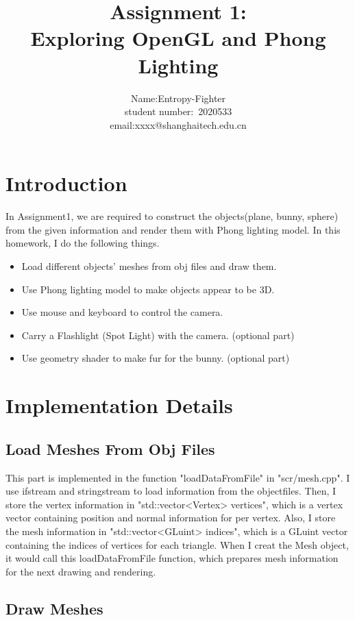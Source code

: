 \documentclass[acmtog]{acmart}
\title{Assignment 1:\\ {Exploring OpenGL and Phong Lighting}}
\author{Name:\quad Entropy-Fighter\\ student number:\ 2020533
\\email:\quad xxxx@shanghaitech.edu.cn}
\begin{document}
\maketitle

\vspace*{2 ex}

\section{Introduction}
\quad
In Assignment1, we are required to construct the objects(plane, bunny, sphere) from the given information and render them with Phong lighting model.
In this homework, I do the following things.
\begin{itemize}
\item Load different objects' meshes from obj files and draw them.
\item Use Phong lighting model to make objects appear to be 3D.
\item Use mouse and keyboard to control the camera.

\item Carry a Flashlight (Spot Light) with the camera. (optional part)
\item Use geometry shader to make fur for the bunny. (optional part)
\end{itemize}

\section{Implementation Details}

\subsection{Load Meshes From Obj Files}
\quad
This part is implemented in the function "loadDataFromFile" in "scr/mesh.cpp". 
I use ifstream and stringstream to load information from the objectfiles. Then, I store the vertex information 
in "std::vector<Vertex> vertices", which is a vertex vector containing position and normal information for per vertex. 
Also, I store the mesh information in "std::vector<GLuint> indices", which is a GLuint vector containing the indices of vertices for each triangle.
When I creat the Mesh object, it would call this loadDataFromFile function, which prepares mesh information for the next drawing and rendering.

\subsection{Draw Meshes}
\end{document}
